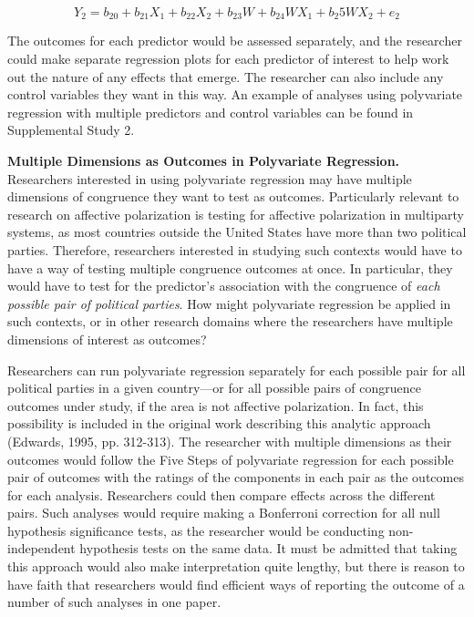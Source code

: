 \documentclass[authordate, meta, issue]{jote-new-article}
\begin{document}
	\begin{equation}
		Y_2= b_{20}+b_{21}X_1+b_{22}X_2+b_{23}W+b_{24}WX_1+b_{2}5WX_2+e_2
	\end{equation}



	The outcomes for each predictor would be assessed separately, and the researcher could make separate regression plots for each predictor of interest to help work out the nature of any effects that emerge. The researcher can also include any control variables they want in this way. An example of analyses using polyvariate regression with multiple predictors and control variables can be found in Supplemental Study 2.



	\textbf{Multiple Dimensions as Outcomes in Polyvariate Regression. }Researchers interested in using polyvariate regression may have multiple dimensions of congruence they want to test as outcomes. Particularly relevant to research on affective polarization is testing for affective polarization in multiparty systems, as most countries outside the United States have more than two political parties. Therefore, researchers interested in studying such contexts would have to have a way of testing multiple congruence outcomes at once. In particular, they would have to test for the predictor's association with the congruence of \emph{each possible pair of political parties}. How might polyvariate regression be applied in such contexts, or in other research domains where the researchers have multiple dimensions of interest as outcomes?



	Researchers can run polyvariate regression separately for each possible pair for all political parties in a given country—or for all possible pairs of congruence outcomes under study, if the area is not affective polarization. In fact, this possibility is included in the original work describing this analytic approach (Edwards, 1995, pp. 312-313). The researcher with multiple dimensions as their outcomes would follow the Five Steps of polyvariate regression for each possible pair of outcomes with the ratings of the components in each pair as the outcomes for each analysis. Researchers could then compare effects across the different pairs. Such analyses would require making a Bonferroni correction for all null hypothesis significance tests, as the researcher would be conducting non-independent hypothesis tests on the same data. It must be admitted that taking this approach would also make interpretation quite lengthy, but there is reason to have faith that researchers would find efficient ways of reporting the outcome of a number of such analyses in one paper.
\end{document}
